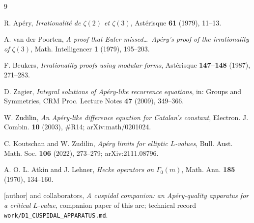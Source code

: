 \documentclass[11pt,reqno]{amsart}
\theoremstyle{plain}
\theoremstyle{definition}
\theoremstyle{remark}
\begin{document}
\begin{thebibliography}{9}

 R. Ap\'ery, \emph{Irrationalit\'e de $\zeta(2)$ et
$\zeta(3)$}, Ast\'erisque \textbf{61} (1979), 11--13.

 A. van der Poorten, \emph{A proof that Euler missed\dots\
Ap\'ery's proof of the irrationality of $\zeta(3)$}, Math. Intelligencer
\textbf{1} (1979), 195--203.

 F. Beukers, \emph{Irrationality proofs using modular
forms}, Ast\'erisque \textbf{147--148} (1987), 271--283.

 D. Zagier, \emph{Integral solutions of Ap\'ery-like
recurrence equations}, in: Groups and Symmetries, CRM Proc. Lecture
Notes \textbf{47} (2009), 349--366.

 W. Zudilin, \emph{An Ap\'ery-like difference
equation for Catalan's constant}, Electron. J. Combin. \textbf{10}
(2003), \#R14; arXiv:math/0201024.

 C. Koutschan and W. Zudilin, \emph{Ap\'ery limits for
elliptic $L$-values}, Bull. Aust. Math. Soc. \textbf{106} (2022),
273--279; arXiv:2111.08796.

 A. O. L. Atkin and J. Lehner, \emph{Hecke operators
on $\Gamma_0(m)$}, Math. Ann. \textbf{185} (1970), 134--160.

 [author] and collaborators, \emph{A cuspidal companion: an
Ap\'ery-quality apparatus for a critical $L$-value}, companion paper of
this arc; technical record \texttt{work/D1\_CUSPIDAL\_APPARATUS.md}.

\end{thebibliography}
\end{document}

